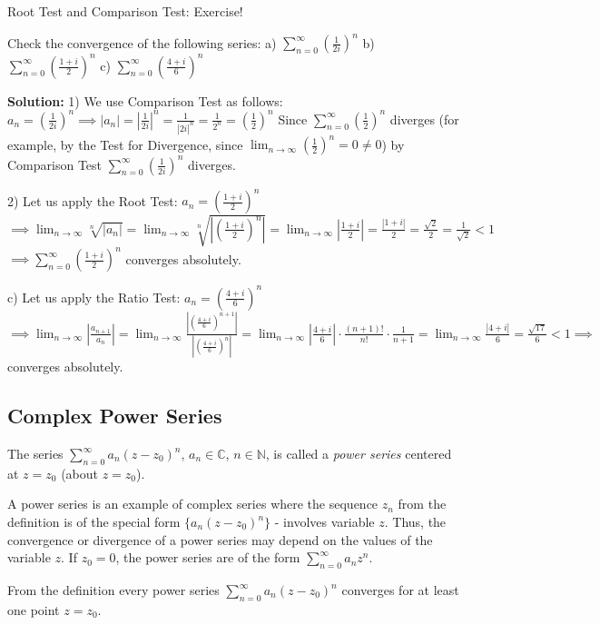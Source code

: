 \documentclass[12pt]{article}
\begin{document}
Root Test and Comparison Test: Exercise!

\begin{example}
Check the convergence of the following series:
a) $\sum_{n=0}^\infty (\frac{1}{2i})^n$
b) $\sum_{n=0}^\infty (\frac{1+i}{2})^n$
c) $\sum_{n=0}^\infty (\frac{4+i}{6})^n$

\textbf{Solution:}
1) We use Comparison Test as follows:
$a_n = (\frac{1}{2i})^n \implies |a_n| = |\frac{1}{2i}|^n = \frac{1}{|2i|^n} = \frac{1}{2^n} = (\frac{1}{2})^n$
Since $\sum_{n=0}^\infty (\frac{1}{2})^n$ diverges (for example, by the Test for Divergence, since $\lim_{n\to\infty} (\frac{1}{2})^n = 0 \neq 0$) by Comparison Test $\sum_{n=0}^\infty (\frac{1}{2i})^n$ diverges.

2) Let us apply the Root Test: $a_n = (\frac{1+i}{2})^n$
$\implies \lim_{n\to\infty} \sqrt[n]{|a_n|} = \lim_{n\to\infty} \sqrt[n]{|(\frac{1+i}{2})^n|} = \lim_{n\to\infty} |\frac{1+i}{2}| = \frac{|1+i|}{2} = \frac{\sqrt{2}}{2} = \frac{1}{\sqrt{2}} < 1$
$\implies \sum_{n=0}^\infty (\frac{1+i}{2})^n$ converges absolutely.

c) Let us apply the Ratio Test: $a_n = (\frac{4+i}{6})^n$
$\implies \lim_{n\to\infty} |\frac{a_{n+1}}{a_n}| = \lim_{n\to\infty} \frac{|(\frac{4+i}{6})^{n+1}|}{|(\frac{4+i}{6})^n|} = \lim_{n\to\infty} |\frac{4+i}{6}| \cdot \frac{(n+1)!}{n!} \cdot \frac{1}{n+1} = \lim_{n\to\infty} \frac{|4+i|}{6} = \frac{\sqrt{17}}{6} < 1 \implies$ converges absolutely.
\end{example}

\subsection{Complex Power Series}
\begin{definition}
The series $\sum_{n=0}^\infty a_n(z-z_0)^n$, $a_n \in \mathbb{C}$, $n \in \mathbb{N}$, is called a \emph{power series} centered at $z=z_0$ (about $z=z_0$).
\end{definition}

A power series is an example of complex series where the sequence $z_n$ from the definition is of the special form $\{a_n(z-z_0)^n\}$ - involves variable $z$. Thus, the convergence or divergence of a power series may depend on the values of the variable $z$. If $z_0 = 0$, the power series are of the form $\sum_{n=0}^\infty a_nz^n$.

\begin{remark}
From the definition every power series $\sum_{n=0}^\infty a_n(z-z_0)^n$ converges for at least one point $z=z_0$.
\end{remark}
\end{document}
